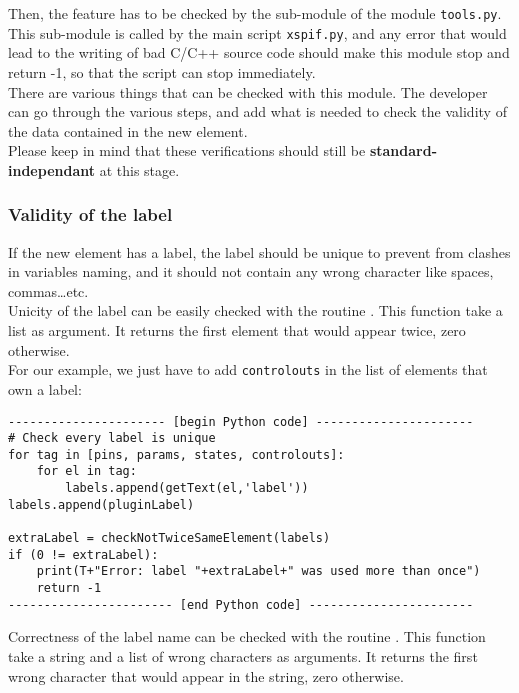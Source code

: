 \noindent Then, the feature has to be checked by the sub-module  of the module \verb|tools.py|. This sub-module is called by the main script \verb|xspif.py|, and any error that would lead to the writing of bad C/C++ source code should make this module stop and return -1, so that the script can stop immediately.\\
\noindent There are various things that can be checked with this module. The developer can go through the various steps, and add what is needed to check the validity of the data contained in the new element.\\
Please keep in mind that these verifications should still be \textbf{standard-independant} at this stage.\\

\subsubsection{Validity of the label}
\noindent If the new element has a label, the label should be unique to prevent from clashes in variables naming, and it should not contain any wrong character like spaces, commas\ldots etc.\\

\noindent Unicity of the label can be easily checked with the routine . This function take a list as argument. It returns the first element that would appear twice, zero otherwise.\\

\noindent For our example, we just have to add \verb|controlouts| in the list of elements that own a label:\\

\begin{verbatim}
---------------------- [begin Python code] ----------------------
# Check every label is unique
for tag in [pins, params, states, controlouts]:
    for el in tag:
        labels.append(getText(el,'label'))
labels.append(pluginLabel)

extraLabel = checkNotTwiceSameElement(labels)
if (0 != extraLabel):
    print(T+"Error: label "+extraLabel+" was used more than once")
    return -1
----------------------- [end Python code] -----------------------
\end{verbatim}

\noindent Correctness of the label name can be checked with the routine . This function take a string and a list of wrong characters as arguments. It returns the first wrong character that would appear in the string, zero otherwise.

